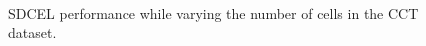 \begin{figure}
    \centering
     \\%
    \caption{SDCEL performance while varying the number of cells in the CCT dataset.} \label{fig:ca}
\end{figure}

